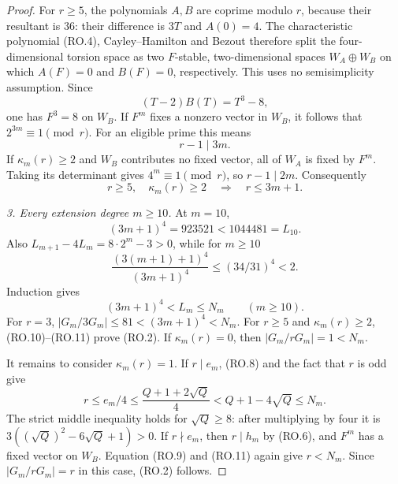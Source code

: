 \begin{proof}
For $r\ge5$, the polynomials $A,B$ are coprime modulo $r$,
because their resultant is $36$: their difference is $3T$
and $A(0)=4$.
The characteristic polynomial (RO.4), Cayley--Hamilton and
Bezout therefore split the four-dimensional torsion space
as two $F$-stable, two-dimensional spaces
$W_A\oplus W_B$ on which $A(F)=0$ and $B(F)=0$,
respectively.  This uses no semisimplicity assumption.
Since
\[
                         (T-2)B(T)=T^3-8,
\]
one has $F^3=8$ on $W_B$.
If $F^m$ fixes a nonzero vector in $W_B$, it follows that
$2^{3m}\equiv1\pmod r$.
For an eligible prime this means
\[
                              r-1\mid3m.
\tag{RO.9}
\]
If $\kappa_m(r)\ge2$ and $W_B$ contributes no fixed
vector, all of $W_A$ is fixed by $F^m$.
Taking its determinant gives $4^m\equiv1\pmod r$,
so $r-1\mid2m$.
Consequently
\[
 r\ge5,\quad\kappa_m(r)\ge2
                  \quad\Longrightarrow\quad r\le3m+1.
\tag{RO.10}
\]

\emph{3. Every extension degree $m\ge10$.}
At $m=10$,
\[
       (3m+1)^4=923521<1044481=L_{10}.
\]
Also
$L_{m+1}-4L_m=8\cdot2^m-3>0$, while for $m\ge10$
\[
 \frac{(3(m+1)+1)^4}{(3m+1)^4}
          \le(34/31)^4<2.
\]
Induction gives
\[
                            (3m+1)^4<L_m\le N_m
                            \qquad(m\ge10).
\tag{RO.11}
\]
For $r=3$, $|G_m/3G_m|\le81<(3m+1)^4<N_m$.
For $r\ge5$ and $\kappa_m(r)\ge2$, (RO.10)--(RO.11)
prove (RO.2).  If $\kappa_m(r)=0$, then
$|G_m/rG_m|=1<N_m$.

It remains to consider $\kappa_m(r)=1$.
If $r\mid e_m$, (RO.8) and the fact that $r$ is odd give
\[
 r\le e_m/4\le\frac{Q+1+2\sqrt Q}{4}
                    <Q+1-4\sqrt Q\le N_m.
\tag{RO.12}
\]
The strict middle inequality holds for $\sqrt Q\ge8$:
after multiplying by four it is
$3((\sqrt Q)^2-6\sqrt Q+1)>0$.
If $r\nmid e_m$, then $r\mid h_m$ by (RO.6), and
$F^m$ has a fixed vector on $W_B$.
Equation (RO.9) and (RO.11) again give $r<N_m$.
Since $|G_m/rG_m|=r$ in this case, (RO.2) follows.


\end{proof}

